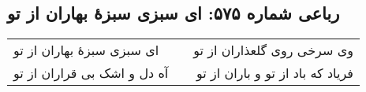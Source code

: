 \begin{center}
\section*{رباعی شماره ۵۷۵: ای سبزی سبزهٔ بهاران از تو}
\label{sec:sh575}
\begin{longtable}{l p{0.5cm} r}
ای سبزی سبزهٔ بهاران از تو
&&
وی سرخی روی گلعذاران از تو
\\
آه دل و اشک بی قراران از تو
&&
فریاد که باد از تو و باران از تو
\\
\end{longtable}
\end{center}
